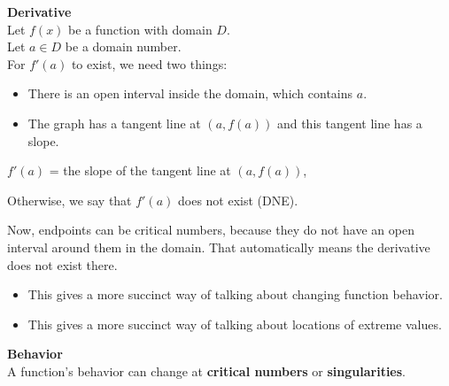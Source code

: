 \documentclass{ximera}
\begin{document}
\begin{definition} \textbf{\textcolor{green!50!black}{Derivative}}  \\

Let $f(x)$ be a function with domain $D$. \\
Let $a \in D$ be a domain number. \\



For $f'(a)$ to exist, we need two things:

\begin{itemize}
\item There is an open interval inside the domain, which contains $a$.
\item The graph has a tangent line at $(a, f(a))$ and this tangent line has a slope.
\end{itemize}



\begin{center}

$f'(a)$ = the slope of the tangent line at $(a, f(a))$,

\end{center}



Otherwise, we say that $f'(a)$ does not exist (DNE).






\end{definition}


Now, endpoints can be critical numbers, because they do not have an open interval around them in the domain.  That automatically means the derivative does not exist there. \\






\begin{itemize}
\item This gives a more succinct way of talking about changing function behavior. 
\item This gives a more succinct way of talking about locations of extreme values. 
\end{itemize}




\begin{idea} \textbf{\textcolor{green!50!black}{Behavior}} \\


A function's behavior can change at \textbf{critical numbers} or \textbf{singularities}.






\end{idea}
\end{document}
